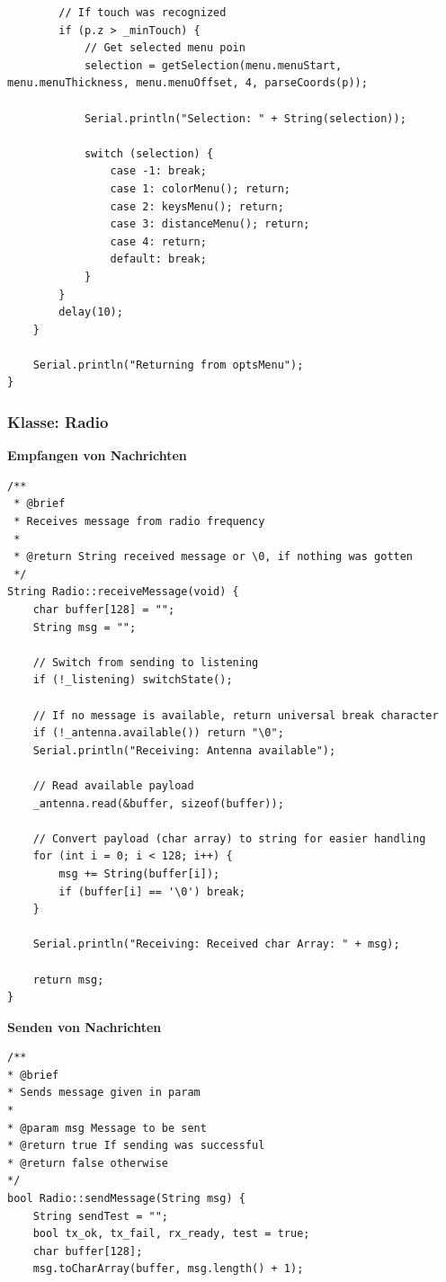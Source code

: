 \documentclass[a4paper, 11pt]{scrartcl}
\begin{document}
\begin{small}
\begin{lstlisting}
        // If touch was recognized
        if (p.z > _minTouch) {
            // Get selected menu poin
            selection = getSelection(menu.menuStart, menu.menuThickness, menu.menuOffset, 4, parseCoords(p));

            Serial.println("Selection: " + String(selection));
            
            switch (selection) {
                case -1: break;
                case 1: colorMenu(); return;
                case 2: keysMenu(); return;
                case 3: distanceMenu(); return;
                case 4: return;
                default: break;
            }
        }
        delay(10);
    }

    Serial.println("Returning from optsMenu");
}
\end{lstlisting}

\subsubsection{Klasse: Radio}
\textbf{Empfangen von Nachrichten}\label{code:receive}
\begin{lstlisting}
/**
 * @brief 
 * Receives message from radio frequency
 * 
 * @return String received message or \0, if nothing was gotten
 */
String Radio::receiveMessage(void) {
    char buffer[128] = "";
    String msg = "";

    // Switch from sending to listening
    if (!_listening) switchState();

    // If no message is available, return universal break character
    if (!_antenna.available()) return "\0";
    Serial.println("Receiving: Antenna available");

    // Read available payload
    _antenna.read(&buffer, sizeof(buffer));

    // Convert payload (char array) to string for easier handling
    for (int i = 0; i < 128; i++) {
        msg += String(buffer[i]);
        if (buffer[i] == '\0') break;
    }

    Serial.println("Receiving: Received char Array: " + msg);

    return msg;
}
\end{lstlisting}

\begin{flushleft}\textbf{Senden von Nachrichten}\label{code:sending}\end{flushleft}
\begin{lstlisting}
/**
* @brief 
* Sends message given in param
* 
* @param msg Message to be sent
* @return true If sending was successful
* @return false otherwise
*/
bool Radio::sendMessage(String msg) {
    String sendTest = "";
    bool tx_ok, tx_fail, rx_ready, test = true;
    char buffer[128];
    msg.toCharArray(buffer, msg.length() + 1);
    

\end{lstlisting}
\end{small}
\end{document}
